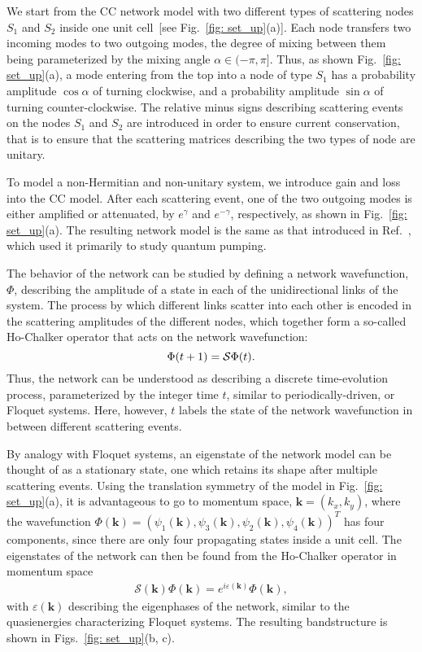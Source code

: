 \documentclass[aps,pra,reprint,superscriptaddress,showkeys,amsmath,amssymb,longbibliography]{revtex4-1}
\begin{document}
We start from the CC network model with two different types of scattering nodes $S_1$ and $S_2$ inside one unit cell~[see Fig.~\ref{fig: set_up}(a)]. 
Each node transfers two incoming modes to two outgoing modes, the degree of mixing between them being parameterized by the mixing angle $\alpha \in (-\pi, \pi]$.
Thus, as shown Fig.~\ref{fig: set_up}(a), a mode entering from the top into a node of type $S_1$ has a probability amplitude $\cos\alpha$ of turning clockwise, and a probability amplitude $\sin\alpha$ of turning counter-clockwise.
The relative minus signs describing scattering events on the nodes $S_1$ and $S_2$ are introduced in order to ensure current conservation, that is to ensure that the scattering matrices describing the two types of node are unitary.

To model a non-Hermitian and non-unitary system, we introduce gain and loss into the CC model.
After each scattering event, one of the two outgoing modes is either amplified or attenuated, by $e^{\gamma}$ and $e^{-\gamma}$, respectively, as shown in Fig.~\ref{fig: set_up}(a).
The resulting network model is the same as that introduced in Ref.~\cite{Hwsc_model}, which used it primarily to study quantum pumping.

The behavior of the network can be studied by defining a network wavefunction, $\Phi$, describing the amplitude of a state in each of the unidirectional links of the system.
The process by which different links scatter into each other is encoded in the scattering amplitudes of the different nodes, which together form a so-called Ho-Chalker operator \cite{Ho1996} that acts on the network wavefunction:
\begin{equation}
\Phi(t+1) = {\cal S} \Phi(t).
\end{equation}
Thus, the network can be understood as describing a discrete time-evolution process, parameterized by the integer time $t$, similar to periodically-driven, or Floquet systems.
Here, however, $t$ labels the state of the network wavefunction in between different scattering events.

By analogy with Floquet systems, an eigenstate of the network model can be thought of as a stationary state, one which retains its shape after multiple scattering events. 
Using the translation symmetry of the model in Fig.~\ref{fig: set_up}(a), it is advantageous to go to momentum space, $\textbf{k}=(k_x,k_y)$, where the wavefunction $\Phi(\textbf{k})=(\psi_1(\textbf{k}),\psi_3(\textbf{k}),\psi_2(\textbf{k}),\psi_4(\textbf{k}))^{T}$ has four components, since there are only four propagating states inside a unit cell.
The eigenstates of the network can then be found from the Ho-Chalker operator in momentum space~\cite{Ho1996}
\begin{eqnarray}
\mathcal{S}(\textbf{k})\Phi(\textbf{k})=e^{i\varepsilon(\textbf{k})}\Phi(\textbf{k}),\label{eq:hc_momentum}
\end{eqnarray}
with $\varepsilon(\textbf{k})$ describing the eigenphases of the network, similar to the quasienergies characterizing Floquet systems.
The resulting bandstructure is shown in Figs.~\ref{fig: set_up}(b, c).
\end{document}
